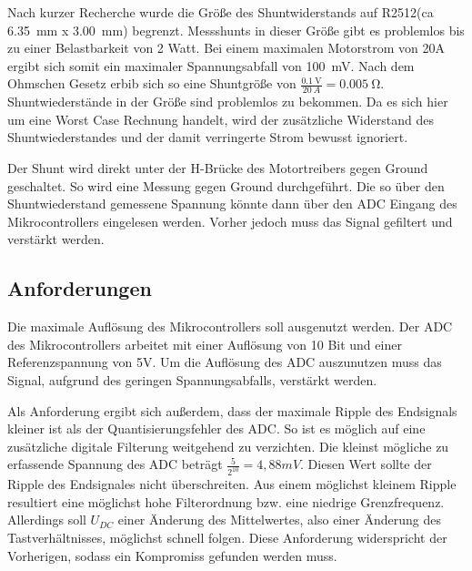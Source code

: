 Nach kurzer Recherche wurde die Größe des Shuntwiderstands auf R2512(ca \SI{6,35}{\mm} x \SI{3,00}{\mm}) begrenzt. Messshunts in dieser Größe gibt es problemlos bis zu einer Belastbarkeit von 2 Watt. 
Bei einem maximalen Motorstrom von 20A ergibt sich somit ein maximaler Spannungsabfall von \SI{100}{\mV}. Nach dem Ohmschen Gesetz erbib sich so eine Shuntgröße von
$\frac{\SI{0,1}{\V}}{\SI{20}{A}}=\SI{0,005}{\ohm}$. Shuntwiederstände in der Größe sind problemlos zu bekommen.
Da es sich hier um eine Worst Case Rechnung handelt, wird der zusätzliche Widerstand des Shuntwiederstandes und der damit verringerte Strom bewusst ignoriert.

Der Shunt wird direkt unter der H-Brücke des Motortreibers gegen Ground geschaltet. So wird eine Messung gegen Ground durchgeführt. Die so über den Shuntwiederstand gemessene Spannung könnte 
dann über den ADC Eingang des Mikrocontrollers eingelesen werden. Vorher jedoch muss das Signal gefiltert und verstärkt werden.

\subsection{Anforderungen}
Die maximale Auflösung des Mikrocontrollers soll ausgenutzt werden. Der ADC des Mikrocontrollers arbeitet mit einer Auflösung von 10 Bit und einer 
Referenzspannung von 5V. Um die Auflösung des ADC auszunutzen muss das Signal, aufgrund des geringen Spannungsabfalls, verstärkt werden.

Als Anforderung ergibt sich außerdem, dass der maximale Ripple des Endsignals kleiner ist als der Quantisierungsfehler des ADC.
So ist es möglich auf eine zusätzliche digitale Filterung weitgehend zu verzichten.
Die kleinst mögliche zu erfassende Spannung des ADC beträgt $\frac{5}{2^{10}}=4,88mV$.
Diesen Wert sollte der Ripple des Endsignales nicht überschreiten.
Aus einem möglichst kleinem Ripple resultiert eine möglichst hohe Filterordnung bzw. eine niedrige Grenzfrequenz.
Allerdings soll $U_{DC}$ einer Änderung des Mittelwertes, also einer Änderung des Tastverhältnisses, möglichst
schnell folgen. Diese Anforderung widerspricht der Vorherigen, sodass ein Kompromiss gefunden werden muss.

